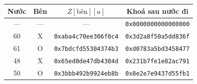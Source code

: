 \begin{tabular}{@{}cccc@{}}
\toprule
\textbf{Nước} & \textbf{Bên} & $Z[\text{bên}][a]$ & \textbf{Khoá sau nước đi} \\
\midrule
--- & --- & --- & \texttt{0x0000000000000000} \\
60 & X & \texttt{0xaba4c70ee306f0c4} & \texttt{0x3d2a8f50a5dd836f} \\
61 & O & \texttt{0x7bdcfd55304374b3} & \texttt{0xd0783a5bd3458477} \\
48 & X & \texttt{0x65ed0de47db4304d} & \texttt{0x231b7fe1e82ac791} \\
50 & O & \texttt{0x3bbb492b9924eb8b} & \texttt{0x8e2e7e9437d55fb1} \\
\bottomrule
\end{tabular}
